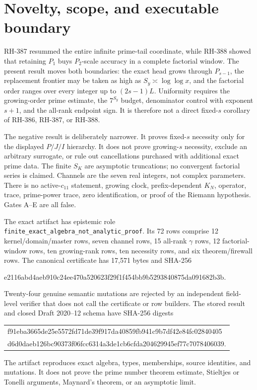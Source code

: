 \documentclass[11pt]{article}
\theoremstyle{definition}
\theoremstyle{remark}
\begin{document}
\section{Novelty, scope, and executable boundary}

RH-387 resummed the entire infinite prime-tail coordinate, while RH-388
showed that retaining $P_1$ buys $P_2$-scale accuracy in a complete
factorial window.  The present result moves both boundaries: the exact
head grows through $P_{s-1}$, the replacement frontier may be taken as
high as $S_y\asymp\log\log x$, and the factorial order ranges over every
integer up to $(2s-1)L$.  Uniformity requires the growing-order prime estimate,
the $7^{S_y}$ budget, denominator control with exponent $s+1$, and the
all-rank endpoint sign.  It is therefore not a direct fixed-$s$
corollary of RH-386, RH-387, or RH-388.

The negative result is deliberately narrower.  It proves fixed-$s$
necessity only for the displayed $P/J/I$ hierarchy.  It does not prove
growing-$s$ necessity, exclude an arbitrary surrogate, or rule out
cancellations purchased with additional exact prime data.  The finite
$S_K$ are asymptotic truncations; no convergent factorial series is
claimed.  Channels are the seven real integers, not complex parameters.
There is no active-$c_{11}$ statement, growing clock, prefix-dependent
$K_N$, operator, trace, prime-power trace, zero identification, or proof
of the Riemann hypothesis.  Gates A--E are all false.

The exact artifact has epistemic role
\texttt{finite\_exact\_algebra\_not\_analytic\_proof}.  Its 72 rows comprise 12
kernel/domain/master rows, seven channel rows, 15 all-rank $\gamma$ rows,
12 factorial-window rows, ten growing-rank rows, ten necessity rows, and
six theorem/firewall rows.  The canonical certificate has 17,571 bytes
and SHA-256
\begin{center}
\small\ttfamily
e2116abd4aeb910c24ee470a520623f29f1f454bb9b5293840875da091682b3b.
\end{center}
Twenty-four genuine semantic mutations are rejected by an independent
field-level verifier that does not call the certificate or row builders.
The stored result and closed Draft 2020--12 schema have SHA-256 digests
\begin{center}
\small\ttfamily
\begin{tabular}{@{}l@{}}
f91eba3665de25e5572fd71de39f917da40859fb941c9b7df42e84fc02840405\\
d6d0daeb126bc90373f06fcc6314a3de1cb6cfda204629945ef77c7078406039.
\end{tabular}
\end{center}
The artifact reproduces exact algebra, types, memberships, source
identities, and mutations.  It does not prove the prime number theorem
estimate, Stieltjes or Tonelli arguments, Maynard's theorem, or an
asymptotic limit.
\end{document}
